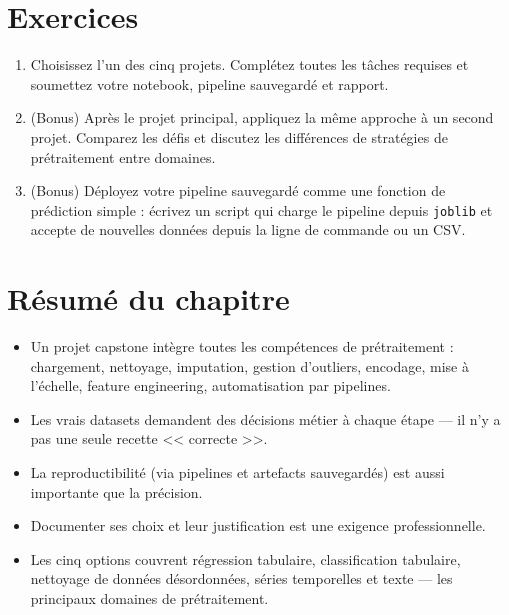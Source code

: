 \section{Exercices}

\begin{exercise}
\begin{enumerate}
  \item Choisissez l'un des cinq projets. Compl\'etez toutes les t\^aches requises et soumettez votre notebook, pipeline sauvegard\'e et rapport.
  \item (Bonus) Apr\`es le projet principal, appliquez la m\^eme approche \`a un second projet. Comparez les d\'efis et discutez les diff\'erences de strat\'egies de pr\'etraitement entre domaines.
  \item (Bonus) D\'eployez votre pipeline sauvegard\'e comme une fonction de pr\'ediction simple : \'ecrivez un script qui charge le pipeline depuis \texttt{joblib} et accepte de nouvelles donn\'ees depuis la ligne de commande ou un CSV.
\end{enumerate}
\end{exercise}

\section{R\'esum\'e du chapitre}

\begin{itemize}
  \item Un projet capstone int\`egre toutes les comp\'etences de pr\'etraitement : chargement, nettoyage, imputation, gestion d'outliers, encodage, mise \`a l'\'echelle, feature engineering, automatisation par pipelines.
  \item Les vrais datasets demandent des d\'ecisions m\'etier \`a chaque \'etape --- il n'y a pas une seule recette << correcte >>.
  \item La reproductibilit\'e (via pipelines et artefacts sauvegard\'es) est aussi importante que la pr\'ecision.
  \item Documenter ses choix et leur justification est une exigence professionnelle.
  \item Les cinq options couvrent r\'egression tabulaire, classification tabulaire, nettoyage de donn\'ees d\'esordonn\'ees, s\'eries temporelles et texte --- les principaux domaines de pr\'etraitement.
\end{itemize}
